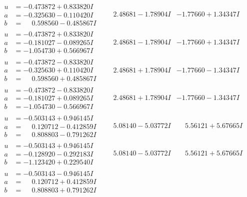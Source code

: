 \documentclass[1p]{elsarticle_modified}
\theoremstyle{definition}
\begin{document}
$$\begin{array}{c|c|c}
\begin{aligned}
u &= -0.473872 + 0.833820 I \\
a &= -0.325630 - 0.110420 I \\
b &= \phantom{-}0.598560 - 0.485867 I\end{aligned}
 & \phantom{-}2.48681 - 1.78904 I & -1.77660 + 1.34347 I \\ \hline\begin{aligned}
u &= -0.473872 + 0.833820 I \\
a &= -0.181027 - 0.089265 I \\
b &= -1.054730 + 0.566967 I\end{aligned}
 & \phantom{-}2.48681 - 1.78904 I & -1.77660 + 1.34347 I \\ \hline\begin{aligned}
u &= -0.473872 - 0.833820 I \\
a &= -0.325630 + 0.110420 I \\
b &= \phantom{-}0.598560 + 0.485867 I\end{aligned}
 & \phantom{-}2.48681 + 1.78904 I & -1.77660 - 1.34347 I \\ \hline\begin{aligned}
u &= -0.473872 - 0.833820 I \\
a &= -0.181027 + 0.089265 I \\
b &= -1.054730 - 0.566967 I\end{aligned}
 & \phantom{-}2.48681 + 1.78904 I & -1.77660 - 1.34347 I \\ \hline\begin{aligned}
u &= -0.503143 + 0.946145 I \\
a &= \phantom{-}0.120712 - 0.412859 I \\
b &= \phantom{-}0.808803 - 0.791262 I\end{aligned}
 & \phantom{-}5.08140 - 5.03772 I & \phantom{-}5.56121 + 5.67665 I \\ \hline\begin{aligned}
u &= -0.503143 + 0.946145 I \\
a &= -0.128920 - 0.292183 I \\
b &= -1.123420 + 0.229540 I\end{aligned}
 & \phantom{-}5.08140 - 5.03772 I & \phantom{-}5.56121 + 5.67665 I \\ \hline\begin{aligned}
u &= -0.503143 - 0.946145 I \\
a &= \phantom{-}0.120712 + 0.412859 I \\
b &= \phantom{-}0.808803 + 0.791262 I\end{aligned}

\end{array}$$
\end{document}
